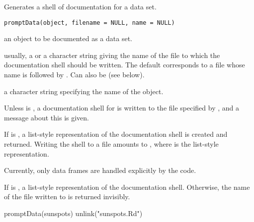 %
\begin{Description}\relax
Generates a shell of documentation for a data set.
\end{Description}
%
\begin{Usage}
\begin{verbatim}
promptData(object, filename = NULL, name = NULL)
\end{verbatim}
\end{Usage}
%
\begin{Arguments}
\begin{ldescription}
\item[\code{object}] an \R{} object to be documented as a data set.
\item[\code{filename}] usually, a  or a character string giving the
name of the file to which the documentation shell should be written.
The default corresponds to a file whose name is  followed
by .  Can also be  (see below).
\item[\code{name}] a character string specifying the name of the object.
\end{ldescription}
\end{Arguments}
%
\begin{Details}\relax
Unless  is , a documentation shell for
 is written to the file specified by , and
a message about this is given.

If  is , a list-style representation of the
documentation shell is created and returned.  Writing the shell to a
file amounts to ,
where  is the list-style representation.

Currently, only data frames are handled explicitly by the code.
\end{Details}
%
\begin{Value}
If  is , a list-style representation of the
documentation shell.  Otherwise, the name of the file written to is
returned invisibly.
\end{Value}
%
\begin{SeeAlso}\relax
{}
\end{SeeAlso}
%
\begin{Examples}
\begin{ExampleCode}
promptData(sunspots)
unlink("sunspots.Rd")
\end{ExampleCode}
\end{Examples}
